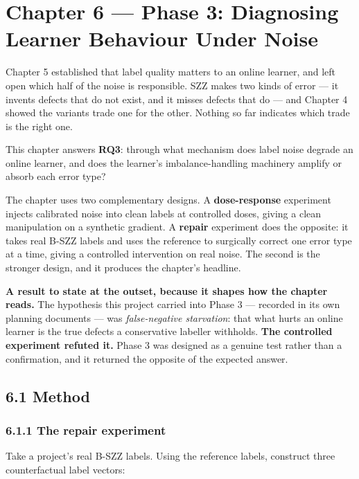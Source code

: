 \chapter{Chapter 6 --- Phase 3: Diagnosing Learner Behaviour Under
Noise}\label{chapter-6-phase-3-diagnosing-learner-behaviour-under-noise}

Chapter 5 established that label quality matters to an online learner,
and left open which half of the noise is responsible. SZZ makes two
kinds of error --- it invents defects that do not exist, and it misses
defects that do --- and Chapter 4 showed the variants trade one for the
other. Nothing so far indicates which trade is the right one.

This chapter answers \textbf{RQ3}: through what mechanism does label
noise degrade an online learner, and does the learner's
imbalance-handling machinery amplify or absorb each error type?

The chapter uses two complementary designs. A \textbf{dose-response}
experiment injects calibrated noise into clean labels at controlled
doses, giving a clean manipulation on a synthetic gradient. A
\textbf{repair} experiment does the opposite: it takes real B-SZZ labels
and uses the reference to surgically correct one error type at a time,
giving a controlled intervention on real noise. The second is the
stronger design, and it produces the chapter's headline.

\textbf{A result to state at the outset, because it shapes how the
chapter reads.} The hypothesis this project carried into Phase 3 ---
recorded in its own planning documents --- was \emph{false-negative
starvation}: that what hurts an online learner is the true defects a
conservative labeller withholds. \textbf{The controlled experiment
refuted it.} Phase 3 was designed as a genuine test rather than a
confirmation, and it returned the opposite of the expected answer.

\section{6.1 Method}\label{method}

\subsection{6.1.1 The repair experiment}\label{the-repair-experiment}

Take a project's real B-SZZ labels. Using the reference labels,
construct three counterfactual label vectors:


